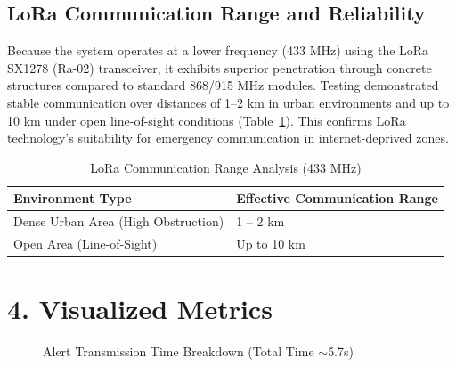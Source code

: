\documentclass[11pt, a4paper]{article}
\begin{document}
\subsection{LoRa Communication Range and Reliability}

Because the system operates at a lower frequency (433 MHz) using the LoRa SX1278 (Ra-02) transceiver, it exhibits superior penetration through concrete structures compared to standard 868/915 MHz modules. Testing demonstrated stable communication over distances of 1--2 km in urban environments and up to 10 km under open line-of-sight conditions (Table~\ref{tab:lora_range}). This confirms LoRa technology's suitability for emergency communication in internet-deprived zones.

\begin{table}[hbt!]
\centering
\caption{LoRa Communication Range Analysis (433 MHz)}
\label{tab:lora_range}
\renewcommand{\arraystretch}{1.3}
\begin{tabular}{@{}ll@{}}
\toprule
\textbf{Environment Type} & \textbf{Effective Communication Range} \\ \midrule
Dense Urban Area (High Obstruction) & 1 -- 2 km \\
Open Area (Line-of-Sight) & Up to 10 km \\ \bottomrule
\end{tabular}
\end{table}

\section*{4. Visualized Metrics}

\begin{figure}[hbt!]
\centering
{}
\caption{Alert Transmission Time Breakdown (Total Time $\sim$5.7s)}
\label{fig:time_breakdown}
\end{figure}
\end{document}
